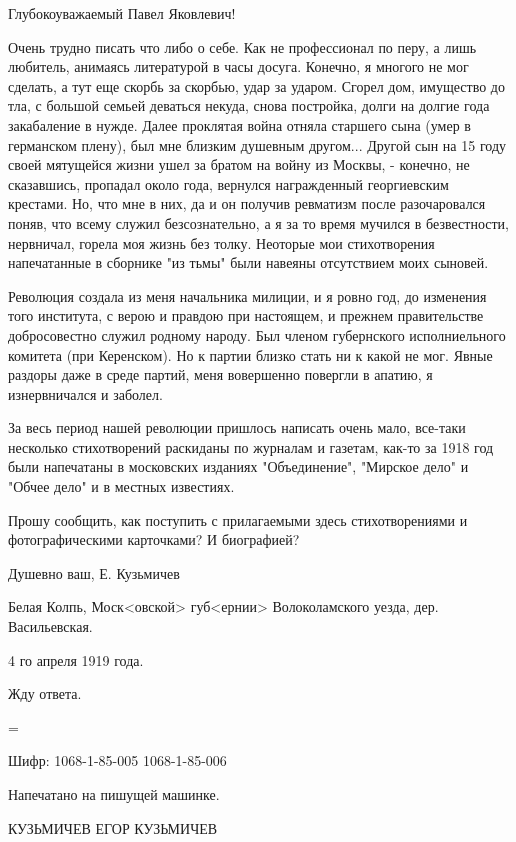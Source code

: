 \documentclass[]{memoir}
\begin{document}
Глубокоуважаемый Павел Яковлевич!

Очень трудно писать что либо о себе. Как не профессионал по перу, а лишь любитель, анимаясь литературой в часы досуга. Конечно, я многого не мог сделать, а тут еще скорбь за скорбью, удар за ударом. Сгорел дом, имущество до тла, с большой семьей деваться некуда, снова постройка, долги на долгие года закабаление в нужде. Далее проклятая война отняла старшего сына (умер в германском плену), был мне близким душевным другом... Другой сын на 15 году своей мятущейся жизни ушел за братом на войну из Москвы, - конечно, не сказавшись, пропадал около года, вернулся награжденный георгиевским крестами. Но, что мне в них, да и он получив ревматизм после разочаровался поняв, что всему служил безсознательно, а я за то время мучился в безвестности, нервничал, горела моя жизнь без толку. Неоторые мои стихотворения напечатанные в сборнике "из тьмы" были навеяны отсутствием моих сыновей.

Революция создала из меня начальника милиции, и я ровно год, до изменения того института, с верою и правдою при настоящем, и прежнем правительстве добросовестно служил родному народу. Был членом губернского исполниельного комитета (при Керенском). Но к партии близко стать ни к какой не мог. Явные раздоры даже в среде партий, меня вовершенно повергли в апатию, я изнервничался и заболел.

За весь период нашей революции пришлось написать очень мало, все-таки несколько стихотворений раскиданы по журналам и газетам, как-то за 1918 год были напечатаны в московских изданиях "Объединение", "Мирское дело" и "Обчее дело" и в местных известиях.

Прошу сообщить, как поступить с прилагаемыми здесь стихотворениями и фотографическими карточками? И биографией?

Душевно ваш, Е. Кузьмичев

Белая Колпь, Моск<овской> губ<ернии> Волоколамского уезда, дер. Васильевская.

4 го апреля 1919 года.

Жду ответа.


=

Шифр:   1068-1-85-005
        1068-1-85-006

Напечатано на пишущей машинке.

КУЗЬМИЧЕВ ЕГОР КУЗЬМИЧЕВ
\end{document}
